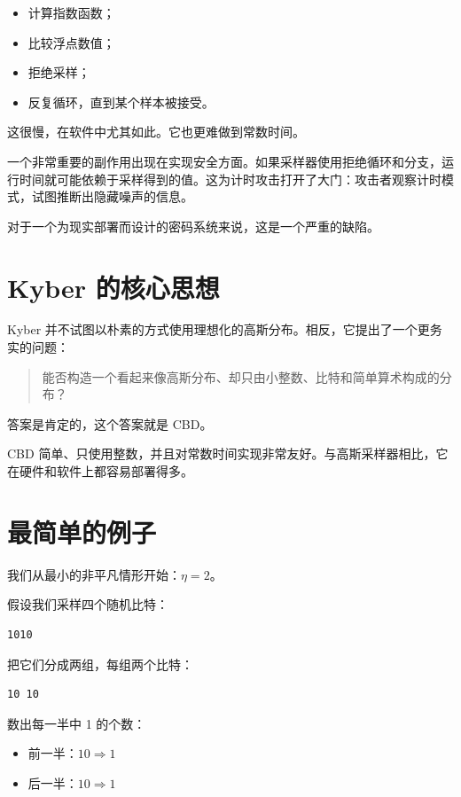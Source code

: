\begin{itemize}
  \item 计算指数函数；
  \item 比较浮点数值；
  \item 拒绝采样；
  \item 反复循环，直到某个样本被接受。
\end{itemize}

这很慢，在软件中尤其如此。它也更难做到常数时间。

一个非常重要的副作用出现在实现安全方面。如果采样器使用拒绝循环和分支，运行时间就可能依赖于采样得到的值。这为计时攻击打开了大门：攻击者观察计时模式，试图推断出隐藏噪声的信息。

对于一个为现实部署而设计的密码系统来说，这是一个严重的缺陷。

\section{Kyber 的核心思想}

Kyber 并不试图以朴素的方式使用理想化的高斯分布。相反，它提出了一个更务实的问题：

\begin{quote}
能否构造一个看起来像高斯分布、却只由小整数、比特和简单算术构成的分布？
\end{quote}

答案是肯定的，这个答案就是 CBD。

CBD 简单、只使用整数，并且对常数时间实现非常友好。与高斯采样器相比，它在硬件和软件上都容易部署得多。

\section{最简单的例子}

我们从最小的非平凡情形开始：\(\eta=2\)。

假设我们采样四个随机比特：

\begin{verbatim}
1010
\end{verbatim}

把它们分成两组，每组两个比特：

\begin{verbatim}
10 10
\end{verbatim}

数出每一半中 1 的个数：

\begin{itemize}
  \item 前一半：\(10 \Rightarrow 1\)
  \item 后一半：\(10 \Rightarrow 1\)
\end{itemize}

